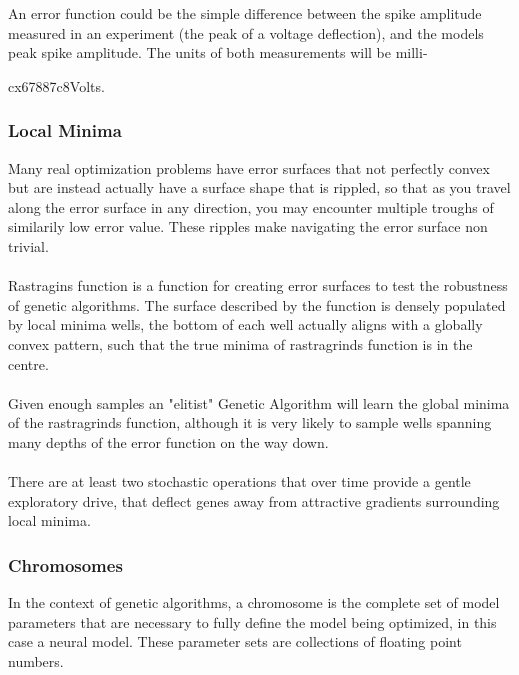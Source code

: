 An error function could be the simple difference between the spike amplitude measured in an experiment (the peak of a voltage deflection), and the models peak spike amplitude. The units of both measurements will be milli-

cx67887c8Volts.  


\subsubsection{Local Minima} Many real optimization problems have error surfaces that not perfectly convex but are instead actually have a surface shape that is rippled, so that as you travel along the error surface in any direction, you may encounter multiple troughs of similarily low error value. These ripples make navigating the error surface non trivial.\\ 
\\
Rastragins function is a function for creating error surfaces to test the robustness of genetic algorithms. The surface described by the function is densely populated by local minima wells, the bottom of each well actually aligns with a globally convex pattern, such that the true minima of rastragrinds function is in the centre.\\
\\
Given enough samples an "elitist" Genetic Algorithm will learn the global minima of the rastragrinds function, although it is very likely to sample wells spanning many depths of the error function on the way down.\\
\\
There are at least two stochastic operations that over time provide a gentle exploratory drive, that deflect genes away from attractive  gradients surrounding local minima.
 

\subsubsection{Chromosomes}
In the context of genetic algorithms, a chromosome is the complete set of model parameters that are necessary to fully define the model being optimized, in this case a neural model. These parameter sets are collections of floating point numbers.
